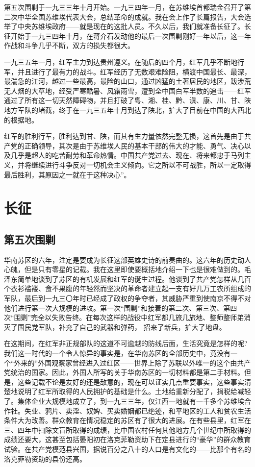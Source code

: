 \documentclass[10pt]{book}
\begin{document}
第五次围剿于一九三三年十月开始。一九三四年一月，在苏维埃首都瑞金召开了第二次中华全国苏维埃代表大会，总结革命的成就。我在会上作了长篇报告，大会选举了中央苏维埃政府——就是现在的这批人员。不久以后，我们就准备长征了。长征开始于一九三四年十月，在蒋介石发动他的最后一次围剿刚好一年以后，这一年作战和斗争几乎不断，双方的损失都很大。

一九三五年一月，红军主力到达贵州遵义。在随后的四个月，红军几乎不断地行军，并且进行了最有力的战斗。红军经历了无数艰难险阻，横渡中国最长、最深，最湍急的江河，越过一些最高，最险的山口，通过凶猛的土著居民的地区，跋涉荒无人烟的大草地，经受严寒酷暑、风霜雨雪，遭到全中国白军半数的追击——红军通过了所有这一切天然障碍物，并且打破了粤、湘、桂、黔、滇、康、川、甘、陕地方军队的堵截，终于在一九三五年十月到达了陕北，扩大了目前在中国的大西北的根据地。

红军的胜利行军，胜利达到甘、陕，而其有生力量依然完整无损，这首先是由于共产党的正确领导，其次是由于苏维埃人民的基本干部的伟大的才能、勇气、决心以及几乎是超人的吃苦耐劳和革命热情。中国共产党过去、现在、将来都忠于马列主义，并将继续进行斗争反对一切机会主义倾向。它之所以不可战胜，所以一定取得最后胜利，其原因之一就在于这种决心”。



\chapter{长征}

\section{第五次围剿}

华南苏区的六年，注定是要成为长征这部英雄史诗的前奏曲的。这六年的历史动人心魄，但是只有零星的记载。我在这里即使要概括地介绍一下也是很难做到的。毛泽东简单地谈到了苏区的有机发展和红军的诞生过程。他谈到了共产党怎样从几百个衣衫褴褛、食不果腹的年轻然而坚决的革命者建立起一支有好几万工农所组成的军队，最后到一九三〇年时已经成了政权的争夺者，其威胁严重到使南京不得不对他们进行第一次大规模的进攻。第一次“围剿”和接着的第二次、第三次、第四次“围剿”完全以失败告终。在每次这样的战役中红军都几旅几旅地、整师整师弟消灭了国民党军队，补充了自己的武器和弹药， 招来了新兵，扩大了地盘。

在这期间，在红军非正规部队的这道不可逾越的防线后面，生活究竟是怎样的呢?我们这一时代的一个令人惊异的事实是，在华南苏区的全部历史中，竟没有一个“外来的”外国观察家曾经进入过红区——世界上除了苏联以外唯一的这个由共产党统治的国家。因此，外国人所写的关于华南苏区的一切材料都是第二手材料。但是，这些记载不论是友好的还是敌意的，现在可以证实几点重要事实，这些事实清楚地说明了红军所取得的人民拥护的基础是什么。土地给重新分配了，捐税给减轻了。集体企业大规模地成立了，到一九三三年，仅江西一地就有一千多个苏维埃合作社。失业、鸦片、卖淫、奴婢、买卖婚姻都已绝迹，和平地区的工人和贫农生活条件大为改善。群众教育在情况稳定的苏区有了很大的进展。在有些县里，红军在三、四年中扫除文盲所取得的成绩，比中国农村任何其他地方几个世纪中所取得的成绩还要大，这甚至包括晏阳初在洛克菲勒资助下在定县进行的“豪华”的群众教育试验。在共产党模范县兴国，据说百分之八十的人口是有文化的——比那个有名的洛克菲勒资助的县份还高。
\end{document}
